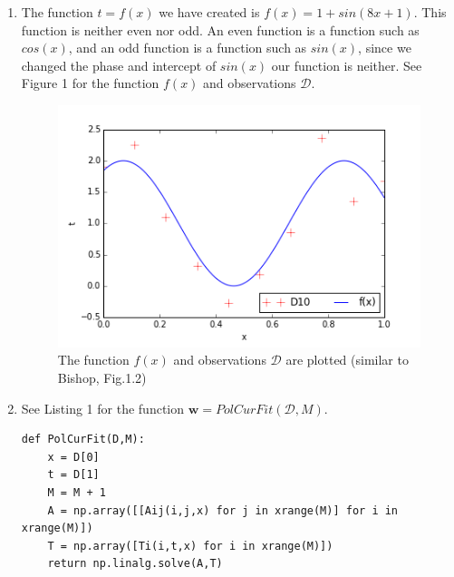 \documentclass[a4paper,11pt]{article}
\theoremstyle{mytheor}
\begin{document}
\begin{enumerate}
	\item The function $t = f(x)$ we have created is $f(x) = 1 + sin(8x+1)$. This function is neither even nor odd. An even function is a function such as $cos(x)$, and an odd function is a function such as $sin(x)$, since we changed the phase and intercept of $sin(x)$ our function is neither. See Figure 1 for the function $f(x)$ and observations $\mathcal{D}$. \vspace{-0.2cm}
		\begin{figure}[h]
			\centering
			\includegraphics[scale=0.8]{1_1.png}\vspace{-0.5cm}
			\caption{\vspace{-0.2cm}The function $f(x)$ and observations $\mathcal{D}$ are plotted (similar to Bishop, Fig.1.2)}
		\end{figure}
	\item See Listing 1 for the function $\boldsymbol{w} = PolCurFit(\mathcal{D},M)$.\vspace{-0.5cm}
		\begin{lstlisting}[label={list:first},caption=Python code for function PolCurFit -- Input are the observations $\mathcal{D}$ and the results $t$ of function $f(x)$ and the order of the polynomial $M$. The functions calculates the $A$-matrix and $T$-vector and solves this equation to find the weights.]
def PolCurFit(D,M):
    x = D[0]
    t = D[1]
    M = M + 1
    A = np.array([[Aij(i,j,x) for j in xrange(M)] for i in xrange(M)])
    T = np.array([Ti(i,t,x) for i in xrange(M)])
    return np.linalg.solve(A,T)


\end{lstlisting}
\end{enumerate}
\end{document}
